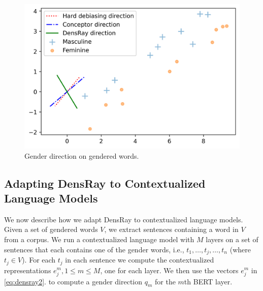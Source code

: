 \begin{figure}[h]
	\centering
	\includegraphics[width=0.4\linewidth]{examples.png}
	\caption{Gender direction on gendered words.}
\end{figure}

\subsection{Adapting DensRay to Contextualized Language Models}
We now describe how we adapt DensRay to contextualized
language models. Given a set of gendered words
$V$, we extract sentences containing a word in $V$ from a
corpus. We run a contextualized language model
with $M$ layers
on a set of 
sentences that each contains one of the gender words, i.e., 
$t_1,\ldots,t_j,\ldots,t_n$ (where $t_j \in V$). 
For each $t_j $ in each sentence we  compute the contextualized representations $e_j^m, 1\leq m
\leq M$, one for each layer. We then use the vectors $e_j^m$ in \eqref{eq:densray2}.
to compute a gender direction
$q_m$ for the $m$th BERT layer. 
